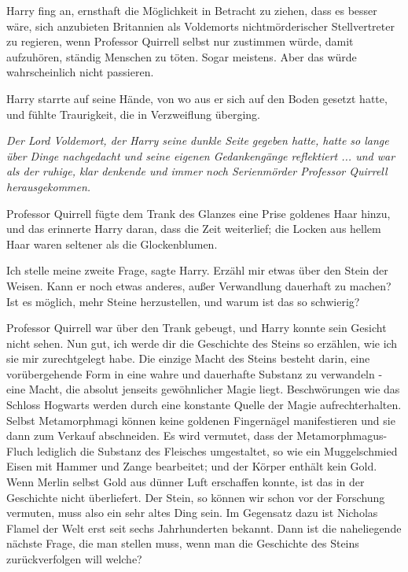 Harry fing an, ernsthaft die Möglichkeit in Betracht zu ziehen, dass es besser
wäre, sich anzubieten Britannien als Voldemorts nichtmörderischer Stellvertreter
zu regieren, wenn Professor Quirrell selbst nur zustimmen würde, damit
aufzuhören, ständig Menschen zu töten. Sogar meistens. Aber das würde
wahrscheinlich nicht passieren.

Harry starrte auf seine Hände, von wo aus er sich auf den Boden gesetzt hatte,
und fühlte Traurigkeit, die in Verzweiflung überging.

\emph{Der Lord Voldemort, der Harry seine dunkle Seite gegeben hatte, hatte so
lange über Dinge nachgedacht und seine eigenen Gedankengänge reflektiert ... und
war als der ruhige, klar denkende und immer noch Serienmörder Professor Quirrell
herausgekommen.}

Professor Quirrell fügte dem Trank des Glanzes eine Prise goldenes Haar hinzu,
und das erinnerte Harry daran, dass die Zeit weiterlief; die Locken aus hellem
Haar waren seltener als die Glockenblumen.

\glqq{}Ich stelle meine zweite Frage\grqq{}, sagte Harry. \glqq{}Erzähl mir etwas
über den Stein der Weisen. Kann er noch etwas anderes, außer Verwandlung
dauerhaft zu machen? Ist es möglich, mehr Steine herzustellen, und warum ist das
so schwierig?\grqq{}

Professor Quirrell war über den Trank gebeugt, und Harry konnte sein Gesicht
nicht sehen. \glqq{}Nun gut, ich werde dir die Geschichte des Steins so erzählen,
wie ich sie mir zurechtgelegt habe. Die einzige Macht des Steins besteht darin,
eine vorübergehende Form in eine wahre und dauerhafte Substanz zu verwandeln -
eine Macht, die absolut jenseits gewöhnlicher Magie liegt. Beschwörungen wie das
Schloss Hogwarts werden durch eine konstante Quelle der Magie aufrechterhalten.
Selbst Metamorphmagi können keine goldenen Fingernägel manifestieren und sie
dann zum Verkauf abschneiden. Es wird vermutet, dass der Metamorphmagus-Fluch
lediglich die Substanz des Fleisches umgestaltet, so wie ein Muggelschmied Eisen
mit Hammer und Zange bearbeitet; und der Körper enthält kein Gold. Wenn Merlin
selbst Gold aus dünner Luft erschaffen konnte, ist das in der Geschichte nicht
überliefert. Der Stein, so können wir schon vor der Forschung vermuten, muss
also ein sehr altes Ding sein. Im Gegensatz dazu ist Nicholas Flamel der Welt
erst seit sechs Jahrhunderten bekannt. Dann ist die naheliegende nächste Frage,
die man stellen muss, wenn man die Geschichte des Steins zurückverfolgen will
welche?\grqq{}

